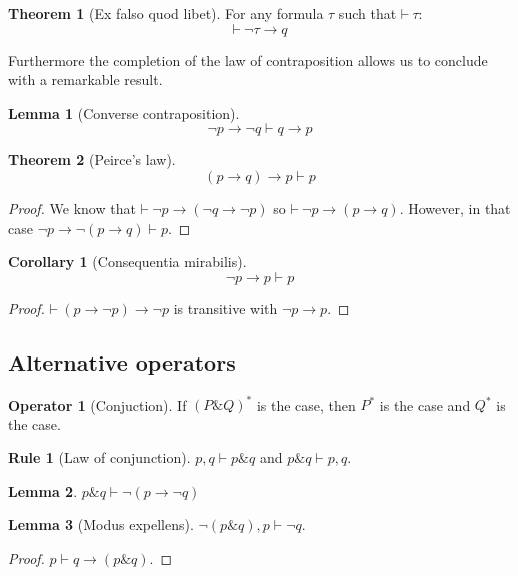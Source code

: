 \documentclass{amsbook}
\newcommand{\infers}{\mathrel\vdash}
\newcommand{\theorem}{\mathord\vdash\medspace}
\newcommand{\then}{\mathrel\rightarrow}
\newcommand{\conj}{\mathrel\&}
\theoremstyle{definition}
\newtheorem{frule}{Rule}[chapter]
\newtheorem{op}{Operator}[chapter]
\newtheorem{thm}{Theorem}[section]
\newtheorem{lmm}{Lemma}[section]
\newtheorem{crl}{Corollary}[section]
\begin{document}
\begin{thm}[Ex falso quod libet]
    For any formula $\tau$ such that $\theorem \tau$:
    $$\theorem \neg\tau \then q$$
\end{thm}

Furthermore the completion of the law of contraposition allows us to conclude with a remarkable result.

\begin{lmm}[Converse contraposition]
    $$\neg p \then \neg q \infers q \then p$$
\end{lmm}

\begin{thm}[Peirce's law]
    $$(p \then q) \then p \infers p$$
    \begin{proof}
        We know that $\theorem \neg p \then (\neg q \then \neg p)$ so $\theorem \neg p \then (p \then q)$. However, in that case $\neg p \then \neg(p \then q) \infers p$.
    \end{proof}
\end{thm}

\begin{crl}[Consequentia mirabilis]
    $$\neg p \then p \infers p$$
    \begin{proof}
        $\theorem (p \then \neg p) \then \neg p$ is transitive with $\neg p \then p$.
    \end{proof}
\end{crl}


\subsection{Alternative operators}

\begin{op}[Conjuction]
    If $(P \conj Q)^*$ is the case, then $P^*$ is the case and $Q^*$ is the case.
\end{op}

\begin{frule}[Law of conjunction]
    $p, q \infers p \conj q$ and $p \conj q \infers p, q$.
\end{frule}

\begin{lmm}
    $p \conj q \infers \neg(p \then \neg q)$
\end{lmm}

\begin{lmm}[Modus expellens]
    $\neg(p \conj q), p \infers \neg q$.
    \begin{proof}
        $p \infers q \then (p \conj q)$.
    \end{proof}
\end{lmm}
\end{document}
